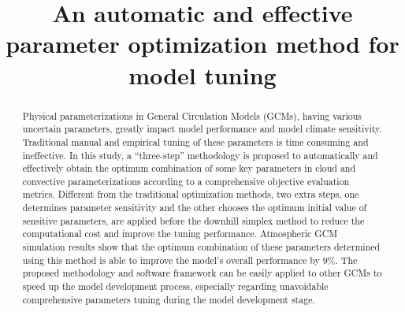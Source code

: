 \documentclass[gmd, manuscript]{copernicus}
\begin{document}
\linenumbers

\title{An automatic and effective parameter optimization method for model tuning}
















\maketitle
 

\begin{abstract}  

Physical parameterizations in General Circulation Models (GCMs), having various uncertain parameters, greatly impact model performance and model climate sensitivity.  Traditional manual and empirical tuning of these parameters is time consuming and ineffective. In this study, a ``three-step'' methodology is proposed to automatically and effectively obtain the optimum combination of some key parameters in cloud and convective parameterizations according to a comprehensive objective evaluation metrics. Different from the traditional optimization methods, two extra steps, one determines parameter sensitivity and the other chooses the optimum initial value of sensitive parameters, are applied before the downhill  simplex method to reduce the computational cost and improve the tuning performance. Atmospheric GCM simulation results show that the optimum combination of these parameters determined using this method is able to improve the model’s overall performance by 9\%. The proposed methodology and software framework can be easily applied to other GCMs to speed up the model development process, especially regarding unavoidable comprehensive parameters tuning during the model development stage. 

\end{abstract}
\end{document}
